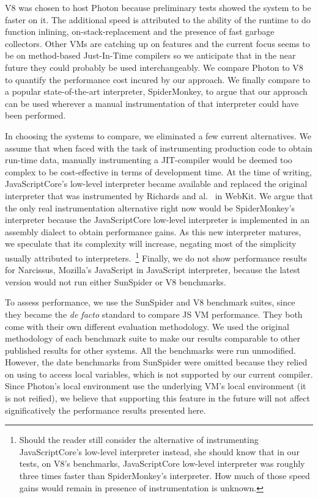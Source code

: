 V8 was chosen to host Photon because preliminary tests showed the system to be
faster on it. The additional speed is attributed to the ability of the runtime
to do function inlining, on-stack-replacement and the presence of fast garbage
collectors. Other VMs are catching up on features and the current focus seems
to be on method-based Just-In-Time compilers so we anticipate that in the near
future they could probably be used interchangeably. We compare Photon to V8 to
quantify the performance cost incured by our approach.  We finally compare to a
popular state-of-the-art interpreter, SpiderMonkey, to argue that our approach
can be used wherever a manual instrumentation of that interpreter could have
been performed. 

In choosing the systems to compare, we eliminated a few current alternatives.
We assume that when faced with the task of instrumenting production code to
obtain run-time data, manually instrumenting a JIT-compiler would be deemed too
complex to be cost-effective in terms of development time. At the time of
writing, JavaScriptCore's low-level interpreter became available and replaced
the original interpreter that was instrumented by Richards and
al.~\cite{behavior_js} in WebKit.  We argue that the only real instrumentation
alternative right now would be SpiderMonkey's interpreter because the
JavaScriptCore low-level interpreter is implemented in an assembly dialect to
obtain performance gains. As this new interpreter matures, we speculate that
its complexity will increase, negating most of the simplicity usually
attributed to interpreters.~\footnote{Should the reader still consider the
alternative of instrumenting JavaScriptCore's low-level interpreter instead,
she should know that in our tests, on V8's benchmarks, JavaScriptCore low-level
interpreter was roughly three times faster than SpiderMonkey's interpreter. How
much of those speed gains would remain in presence of instrumentation is
unknown.} Finally, we do not show performance results for Narcissus, Mozilla's
JavaScript in JavaScript interpreter, because the latest version would not run
either SunSpider or V8 benchmarks.

To assess performance, we use the SunSpider and V8 benchmark suites, since they
became the \textit{de facto} standard to compare JS VM performance. They both
come with their own different evaluation methodology. We used the original
methodology of each benchmark suite to make our results comparable to other
published results for other systems. All the benchmarks were run unmodified.
However, the date benchmarks from SunSpider were omitted because they relied on
using  to access local variables, which is not supported by our
current compiler.  Since Photon's local environment use the underlying VM's
local environment (it is not reified), we believe that supporting this feature
in the future will not affect significatively the performance results presented
here.

